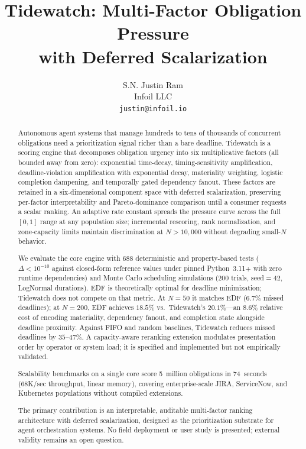 \documentclass[11pt]{article}
\title{Tidewatch: Multi-Factor Obligation Pressure\\with Deferred Scalarization}
\author{S.N. Justin Ram\\Infoil LLC\\
\texttt{justin@infoil.io}}
\date{}
\begin{document}
\maketitle

\begin{abstract}
Autonomous agent systems that manage hundreds to tens of thousands of
concurrent obligations need a prioritization signal richer than a bare
deadline.  Tidewatch is a scoring engine that decomposes obligation
urgency into six multiplicative factors (all bounded away from zero):
exponential time-decay, timing-sensitivity amplification,
deadline-violation amplification with exponential decay, materiality
weighting, logistic completion dampening, and temporally gated
dependency fanout.  These factors are retained in a six-dimensional
component space with deferred scalarization, preserving per-factor
interpretability and Pareto-dominance comparison until a consumer
requests a scalar ranking.  An adaptive rate constant spreads the
pressure curve across the full $[0, 1]$ range at any population size;
incremental rescoring, rank normalization, and zone-capacity limits
maintain discrimination at $N{>}10{,}000$ without degrading
small-$N$ behavior.

We evaluate the core engine with 688 deterministic and property-based
tests ($\Delta < 10^{-10}$ against closed-form reference values under
pinned Python~3.11+ with zero runtime dependencies) and
Monte Carlo scheduling simulations (200 trials, seed${=}42$,
LogNormal durations).  EDF is theoretically optimal for deadline
minimization; Tidewatch does not compete on that metric.  At
$N{=}50$ it matches EDF ($6.7\%$ missed deadlines); at $N{=}200$,
EDF achieves $18.5\%$ vs.\ Tidewatch's $20.1\%$---an $8.6\%$
relative cost of encoding materiality, dependency fanout, and
completion state alongside deadline proximity.  Against FIFO and
random baselines, Tidewatch reduces missed deadlines by
$35$--$47\%$.  A capacity-aware reranking extension modulates
presentation order by operator or system load; it is specified and
implemented but not empirically validated.

Scalability benchmarks on a single core score 5~million obligations
in 74~seconds (68K/sec throughput, linear memory), covering
enterprise-scale JIRA, ServiceNow, and Kubernetes populations
without compiled extensions.

The primary contribution is an interpretable, auditable multi-factor
ranking architecture with deferred scalarization, designed as the
prioritization substrate for agent orchestration systems.  No field deployment or user study is
presented; external validity remains an open question.
\end{abstract}
\end{document}
